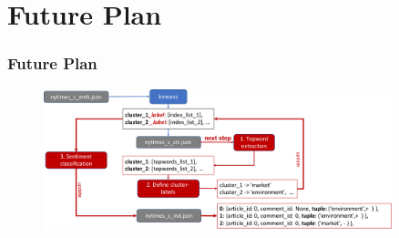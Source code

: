 \documentclass{tum-presentation}
\begin{document}
\section{Future Plan}


\begin{frame}
  \frametitle{Future Plan}
  
    
    
    \begin{figure}[t]
    \includegraphics[width = 0.9\textwidth]{figures/plan.pdf}
    \end{figure}
 
\end{frame}
\end{document}
